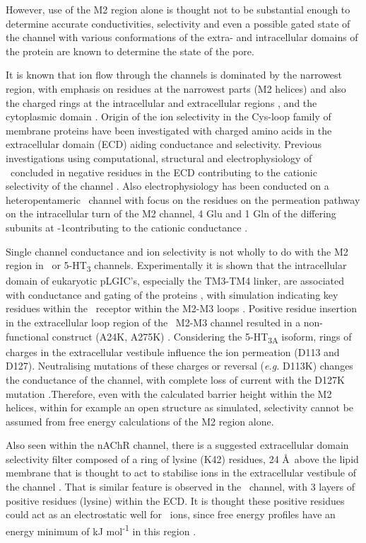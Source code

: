 However, use of the M2 region alone is thought not to be substantial enough to determine accurate conductivities, selectivity and even a possible gated state of the channel with various conformations of the extra- and intracellular domains of the protein are known to determine the state of the pore.

It is known that ion flow through the channels is dominated by the narrowest region, with emphasis on residues at the narrowest parts (M2 helices) and also the charged rings at the intracellular and extracellular regions \cite{Imoto1986}, and the cytoplasmic domain \cite{Kelley2003}. Origin of the ion selectivity in the Cys-loop family of membrane proteins have been investigated with charged amino acids in the extracellular domain (ECD) aiding conductance and selectivity. Previous investigations using computational, structural and electrophysiology of \na\ concluded in negative residues in the ECD contributing to the cationic selectivity of the channel \cite{Sine2010}. Also electrophysiology has been conducted on a heteropentameric \na\ channel with focus on the residues on the permeation pathway on the intracellular turn of the M2 channel, 4 Glu and 1 Gln of the differing subunits at -1\textquotesingle  contributing to the cationic conductance \cite{Cymes2012}. 

Single channel conductance and ion selectivity is not wholly to do with the M2 region in \na\ or 5-HT\textsubscript{3} channels. Experimentally it is shown that the intracellular domain of eukaryotic pLGIC's, especially the TM3-TM4 linker, are associated with conductance and gating of the proteins \cite{Peters2010,Moroni2011}, with simulation indicating key residues within the \HT\ receptor within the M2-M3 loops \cite{Melis2009}. Positive residue insertion in the extracellular loop region of the \HT\ M2-M3 channel resulted in a non-functional construct (A24K, A275K) \cite{Thompson2003}. Considering the 5-HT\textsubscript{3A} isoform, rings of charges in the extracellular vestibule influence the ion permeation (D113 and D127). Neutralising mutations of these charges or reversal (\textit{e.g.} D113K) changes the conductance of the channel, with complete loss of current with the D127K mutation \cite{Livesey2011}.Therefore, even with the calculated barrier height within the M2 helices, within for example an open structure as simulated, selectivity cannot be assumed from free energy calculations of the M2 region alone. 

Also seen within the nAChR channel, there is a suggested extracellular domain selectivity filter composed of a ring of lysine (K42) residues, 24 \AA\ above the lipid membrane that is thought to act to stabilise ions in the extracellular vestibule of the channel \cite{Hansen2008}. That is similar feature is observed in the \gl\ channel, with 3 layers of positive residues (lysine) within the ECD. It is thought these positive residues could act as an electrostatic well for \Cl\ ions, since free energy profiles have an energy minimum of  kJ mol\textsuperscript{-1} in this region \cite{Cheng2012}.

